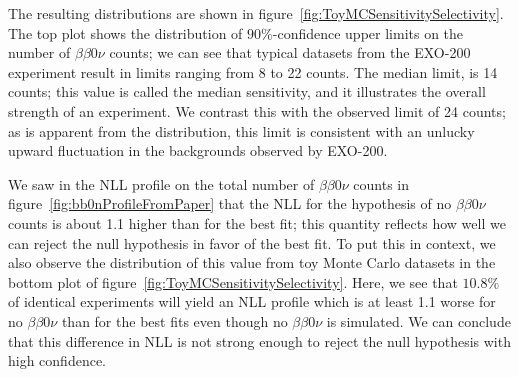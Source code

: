 \renewcommand{\baselinestretch}{2}
\small\normalsize

The resulting distributions are shown in figure~\ref{fig:ToyMCSensitivitySelectivity}.  The top plot shows the distribution of $90\%$-confidence upper limits on the number of $\beta\beta 0\nu$ counts; we can see that typical datasets from the EXO-200 experiment result in limits ranging from 8 to 22 counts.  The median limit, is 14 counts; this value is called the median sensitivity, and it illustrates the overall strength of an experiment.  We contrast this with the observed limit of 24 counts; as is apparent from the distribution, this limit is consistent with an unlucky upward fluctuation in the backgrounds observed by EXO-200.

We saw in the NLL profile on the total number of $\beta\beta 0\nu$ counts in figure~\ref{fig:bb0nProfileFromPaper} that the NLL for the hypothesis of no $\beta\beta 0\nu$ counts is about 1.1 higher than for the best fit; this quantity reflects how well we can reject the null hypothesis in favor of the best fit.  To put this in context, we also observe the distribution of this value from toy Monte Carlo datasets in the bottom plot of figure~\ref{fig:ToyMCSensitivitySelectivity}.  Here, we see that $10.8\%$ of identical experiments will yield an NLL profile which is at least 1.1 worse for no $\beta\beta 0\nu$ than for the best fits even though no $\beta\beta 0\nu$ is simulated.  We can conclude that this difference in NLL is not strong enough to reject the null hypothesis with high confidence.

